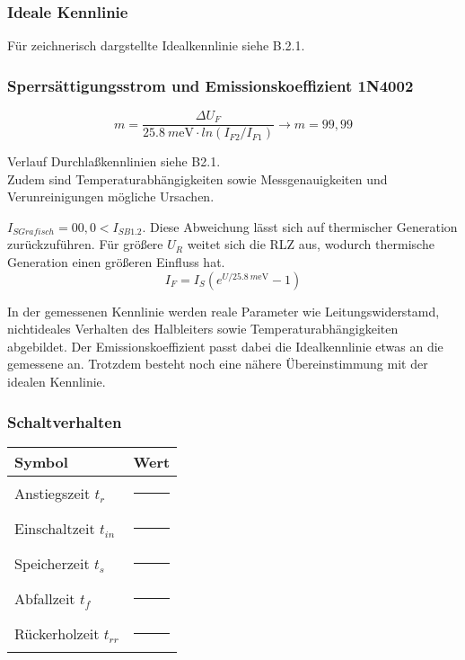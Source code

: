 \documentclass[
	a4paper, %
	12pt, %
]{CSUniSchoolLabReport}
\newcommand{\milli}{m}
\begin{document}
\subsubsection{Ideale Kennlinie}
Für zeichnerisch dargstellte Idealkennlinie siehe B.2.1.

\subsubsection{Sperrsättigungsstrom und Emissionskoeffizient 1N4002}
\vspace{1em} 
\[
m = \frac{\Delta U_F}{\SI{25.8}{\milli\electronvolt}\cdot ln(I_{F2}/I_{F1})} \rightarrow m = 99,99
\]
\vspace{1em}

Verlauf Durchlaßkennlinien siehe B2.1.\\

Zudem sind Temperaturabhängigkeiten sowie Messgenauigkeiten und Verunreinigungen mögliche Ursachen. 

$I_{S Grafisch} = 00,0 < I_{S B1.2}$. Diese Abweichung lässt sich auf thermischer Generation zurückzuführen. Für größere $U_R$ weitet sich die RLZ aus, wodurch thermische Generation einen größeren Einfluss hat. 
\[
I_F = I_S(e^{U/\SI{25.8}{\milli\electronvolt}}-1)
\]

In der gemessenen Kennlinie werden reale Parameter wie Leitungswiderstamd, nichtideales Verhalten des Halbleiters sowie Temperaturabhängigkeiten abgebildet.
Der Emissionskoeffizient passt dabei die Idealkennlinie etwas an die gemessene an. Trotzdem besteht noch eine nähere Übereinstimmung mit der idealen Kennlinie.

\subsubsection{Schaltverhalten}

\vspace{1em} 

\begin{center}
\begin{tabular}{ll}
\toprule
\textbf{Symbol} & \textbf{Wert} \\
\midrule
Anstiegszeit $t_r$       & \rule{3cm}{0.4pt} \\
Einschaltzeit $t_{in}$   & \rule{3cm}{0.4pt} \\
Speicherzeit  $t_s$      & \rule{3cm}{0.4pt} \\
Abfallzeit $t_f$         & \rule{3cm}{0.4pt} \\
Rückerholzeit $t_{rr}$   & \rule{3cm}{0.4pt} \\
\bottomrule
\end{tabular}
\end{center}
\end{document}
